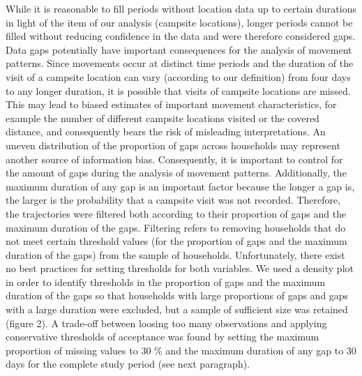 \documentclass[]{elsarticle} %
\begin{document}
While it is reasonable to fill periods without location data up to
certain durations in light of the item of our analysis (campsite
locations), longer periods cannot be filled without reducing confidence
in the data and were therefore considered gaps. Data gaps potentially
have important consequences for the analysis of movement patterns. Since
movements occur at distinct time periods and the duration of the visit
of a campsite location can vary (according to our definition) from four
days to any longer duration, it is possible that visits of campsite
locations are missed. This may lead to biased estimates of important
movement characteristics, for example the number of different campsite
locations visited or the covered distance, and consequently bears the
risk of misleading interpretations. An uneven distribution of the
proportion of gaps across households may represent another source of
information bias. Consequently, it is important to control for the
amount of gaps during the analysis of movement patterns. Additionally,
the maximum duration of any gap is an important factor because the
longer a gap is, the larger is the probability that a campsite visit was
not recorded. Therefore, the trajectories were filtered both according
to their proportion of gaps and the maximum duration of the gaps.
Filtering refers to removing households that do not meet certain
threshold values (for the proportion of gaps and the maximum duration of
the gaps) from the sample of households. Unfortunately, there exist no
best practices for setting thresholds for both variables. We used a
density plot in order to identify thresholds in the proportion of gaps
and the maximum duration of the gaps so that households with large
proportions of gaps and gaps with a large duration were excluded, but a
sample of sufficient size was retained (figure 2). A trade-off between
loosing too many observations and applying conservative thresholds of
acceptance was found by setting the maximum proportion of missing values
to 30 \% and the maximum duration of any gap to 30 days for the complete
study period (see next paragraph).
\end{document}
